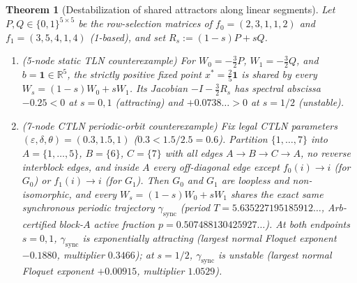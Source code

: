 \documentclass[11pt]{article}
\theoremstyle{plain}
\newtheorem{theorem}{Theorem}
\theoremstyle{definition}
\theoremstyle{remark}
\begin{document}
\begin{theorem}[Destabilization of shared attractors along linear segments]\label{thm:oq14}
Let $P, Q \in \{0, 1\}^{5 \times 5}$ be the row-selection matrices of $f_0 = (2,3,1,1,2)$ and $f_1 = (3,5,4,1,4)$ (1-based), and set $R_s := (1-s)P + sQ$.
\begin{enumerate}[label=\textup{(\arabic*)}]
\item \emph{(5-node static TLN counterexample)} For $W_0 = -\frac{3}{2} P$, $W_1 = -\frac{3}{2} Q$, and $b = \mathbf{1} \in \mathbb{R}^5$, the strictly positive fixed point $x^* = \frac{2}{5}\mathbf{1}$ is shared by every $W_s = (1-s)W_0 + sW_1$. Its Jacobian $-I - \frac{3}{2} R_s$ has spectral abscissa $-0.25 < 0$ at $s = 0, 1$ (attracting) and $+0.0738\dots > 0$ at $s = 1/2$ (unstable).
\item \emph{(7-node CTLN periodic-orbit counterexample)} Fix legal CTLN parameters $(\varepsilon, \delta, \theta) = (0.3, 1.5, 1)$ ($0.3 < 1.5/2.5 = 0.6$). Partition $\{1, \dots, 7\}$ into $A = \{1, \dots, 5\}$, $B = \{6\}$, $C = \{7\}$ with all edges $A \to B \to C \to A$, no reverse interblock edges, and inside $A$ every off-diagonal edge except $f_0(i) \to i$ (for $G_0$) or $f_1(i) \to i$ (for $G_1$). Then $G_0$ and $G_1$ are loopless and non-isomorphic, and every $W_s = (1-s)W_0 + sW_1$ shares the exact same synchronous periodic trajectory $\gamma_{\mathrm{sync}}$ (period $T = 5.635227195185912\dots$, Arb-certified block-$A$ active fraction $p = 0.507488130425927\dots$). At both endpoints $s = 0, 1$, $\gamma_{\mathrm{sync}}$ is exponentially attracting (largest normal Floquet exponent $-0.1880$, multiplier $0.3466$); at $s = 1/2$, $\gamma_{\mathrm{sync}}$ is unstable (largest normal Floquet exponent $+0.00915$, multiplier $1.0529$).
\end{enumerate}
\end{theorem}
\end{document}
